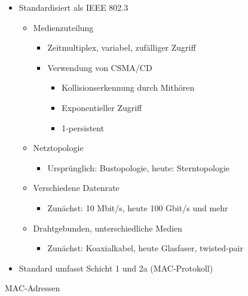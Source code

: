       \begin{itemize}
        \item Standardisiert als IEEE 802.3
          \begin{itemize}
            \item Medienzuteilung
              \begin{itemize}
                \item Zeitmultiplex, variabel, zufälliger Zugriff
                \item Verwendung von CSMA/CD
                  \begin{itemize}
                    \item Kollisionserkennung durch Mithören
                    \item Exponentieller Zugriff
                    \item 1-persistent
                  \end{itemize}
              \end{itemize}
            \item Netztopologie
              \begin{itemize}
                \item Ursprünglich: Bustopologie, heute: Sterntopologie
              \end{itemize}
            \item Verschiedene Datenrate
              \begin{itemize}
                \item Zunächst: 10 Mbit/s, heute 100 Gbit/s und mehr
              \end{itemize}
            \item Drahtgebunden, unterschiedliche Medien
              \begin{itemize}
                \item Zunächst: Koaxialkabel, heute Glasfaser, twisted-pair
              \end{itemize}
          \end{itemize}
        \item Standard umfasst Schicht 1 und 2a (MAC-Protokoll)
      \end{itemize}
      MAC-Adressen
